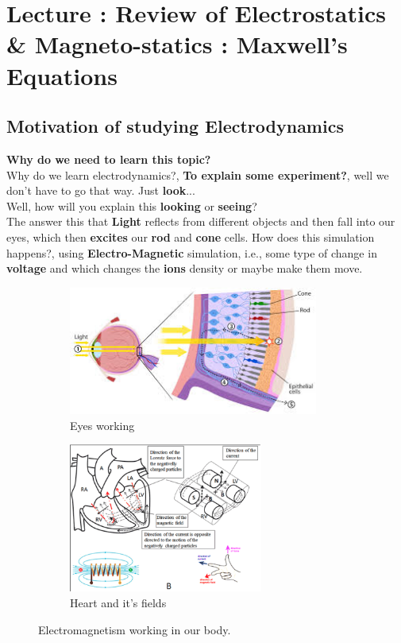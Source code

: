 \documentclass{article}
\newcommand{\lecture}[1]{
  \section{Lecture \thesection: #1}
}
\begin{document}
\tableofcontents \thispagesty{}
\pagebreak
\lecture{Review of Electrostatics \& Magneto-statics : Maxwell's Equations}
\subsection{Motivation of studying Electrodynamics}
\textbf{Why do we need to learn this topic?}\\
Why do we learn electrodynamics?, \textbf{To explain some experiment?}, well we don't have to go that way. Just \textbf{look}...\\
Well, how will you explain this \textbf{looking} or \textbf{seeing}?\\
The answer this that \textbf{Light} reflects from different objects and then fall into our eyes, which then \textbf{excites} our \textbf{rod} and \textbf{cone} cells. How does this simulation happens?, using \textbf{Electro-Magnetic} simulation, i.e., some type of change in \textbf{voltage} and which changes the \textbf{ions} density or maybe make them move.
\begin{figure}[H]
    \centering
    \begin{subfigure}{0.4\textwidth}
        \includegraphics[width=0.9\textwidth]{Images/seeing.jpeg}
        \caption{Eyes working}
        \label{f1a}
    \end{subfigure}
    \hfill
    \begin{subfigure}{0.4\textwidth}
        \includegraphics[width=0.7\textwidth]{Images/Heart.png}
        \caption{Heart and it's fields}
        \label{f1b}
    \end{subfigure}
    \caption{Electromagnetism working in our body.}
    \label{fig:EM_example}
\end{figure}
\end{document}
